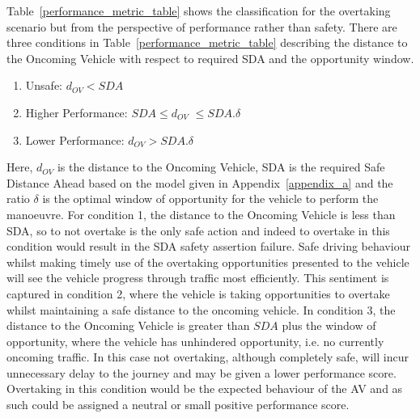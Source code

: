 Table~\ref{performance_metric_table} shows the classification for the overtaking scenario but from the perspective of performance rather than safety. 
%
There are three conditions in Table~\ref{performance_metric_table} describing the distance to the Oncoming Vehicle with respect to required SDA and the opportunity window. 
\begin{enumerate}[1)]
    \item Unsafe: $d_{OV} < SDA$
    \item Higher Performance: $SDA \leq d_{OV}$ $\leq SDA.\delta$
    \item Lower Performance: $d_{OV} > SDA.\delta$
\end{enumerate}
%
Here, $d_{OV}$ is the distance to the Oncoming Vehicle, SDA is the required Safe Distance Ahead based on the model given in Appendix~\ref{appendix_a} and the ratio $\delta$ is the optimal window of opportunity for the vehicle to perform the manoeuvre. 
%
For condition 1, the distance to the Oncoming Vehicle is less than SDA, so to not overtake is the only safe action and indeed to overtake in this condition would result in the SDA safety assertion failure. 
%
Safe driving behaviour whilst making timely use of the overtaking opportunities presented to the vehicle will see the vehicle progress through traffic most efficiently. This sentiment is captured in condition 2, where the vehicle is taking opportunities to overtake whilst maintaining a safe distance to the oncoming vehicle. 
%
In condition 3, the distance to the Oncoming Vehicle is greater than $SDA$ plus the window of opportunity, where the vehicle has unhindered opportunity, i.e. no currently oncoming traffic. In this case not overtaking, although completely safe, will incur unnecessary delay to the journey and may be given a lower performance score. 
%
Overtaking in this condition would be the expected behaviour of the AV and as such could be assigned a neutral or small positive performance score.


